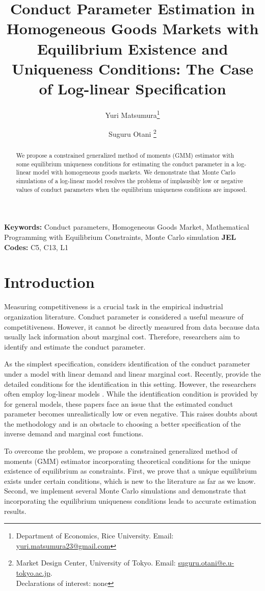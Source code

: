 \documentclass[11pt, a4paper]{article}
\title{Conduct Parameter Estimation in Homogeneous Goods Markets with Equilibrium Existence and Uniqueness Conditions: The Case of Log-linear Specification}
\author{Yuri Matsumura\thanks{Department of Economics, Rice University. Email: \href{mailto:}{yuri.matsumura23@gmail.com}} \and Suguru Otani \thanks{Market Design Center, University of Tokyo. Email: \href{mailto:}{suguru.otani@e.u-tokyo.ac.jp}.
\\Declarations of interest: none %
}}
\theoremstyle{remark}
\begin{document}
\maketitle
\begin{abstract}
    We propose a constrained generalized method of moments (GMM) estimator with some equilibrium uniqueness conditions for estimating the conduct parameter in a log-linear model with homogeneous goods markets.
    We demonstrate that Monte Carlo simulations of a log-linear model resolves the problems of implausibly low or negative values of conduct parameters when the equilibrium uniqueness conditions are imposed.
\end{abstract}

\noindent\textbf{Keywords:} Conduct parameters, Homogeneous Goods Market, Mathematical Programming with Equilibrium Constraints, Monte Carlo simulation
\vspace{0in}
\newline
\noindent\textbf{JEL Codes:} C5, C13, L1

\bigskip


\section{Introduction}
Measuring competitiveness is a crucial task in the empirical industrial organization literature.
Conduct parameter is considered a useful measure of competitiveness. 
However, it cannot be directly measured from data because data usually lack information about marginal cost.
Therefore, researchers aim to identify and estimate the conduct parameter.

As the simplest specification, \citet{bresnahan1982oligopoly} considers identification of the conduct parameter under a model with linear demand and linear marginal cost.
Recently, \cite{matsumura2023resolving} provide the detailed conditions for the identification in this setting. 
However, the researchers often employ log-linear models \citep{okazaki2022excess,merel2009measuring}. 
While the identification condition is provided by \citet{lau1982identifying} for general models, these papers face an issue that the estimated conduct parameter becomes unrealistically low or even negative.
This raises doubts about the methodology and is an obstacle to choosing a better specification of the inverse demand and marginal cost functions.

To overcome the problem, we propose a constrained generalized method of moments (GMM) estimator incorporating theoretical conditions for the unique existence of equilibrium as constraints. 
First, we prove that a unique equilibrium exists under certain conditions, which is new to the literature as far as we know.
Second, we implement several Monte Carlo simulations and demonstrate that incorporating the equilibrium uniqueness conditions leads to accurate estimation results. 
\end{document}

